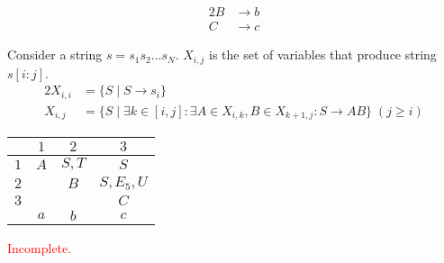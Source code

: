\documentclass[docid=PA09]{tcom_PA}
\begin{document}
{\begin{alignat*}{2}
	B   &\rightarrow b\\
	C   &\rightarrow c
\end{alignat*}
\begin{center}
\end{center}
Consider a string $s=s_1s_2\ldots s_N$. $X_{i,j}$ is the set of variables that produce string $s[i:j]$.
\begin{alignat*}{2}
	X_{i,i} &= \{S\mid S \rightarrow s_i\}\\
	X_{i,j} &= \{S\mid \exists k \in [i,j] \colon \exists A\in X_{i,k},B\in X_{k+1,j}\colon S \rightarrow AB\}\;(j \geq i)
\end{alignat*}
\begin{center} \begin{tabular}{c || c | c | c}
	\backslashbox{$i$}{$j$} & $1             $ & $2             $ & $3      $ \\ \hline
	$1                    $ & $A             $ & $S, T          $ & $S      $ \\
    $2                    $ & \cellcolor{gray} & $B             $ & $S,E_5,U$ \\
	$3                    $ & \cellcolor{gray} & \cellcolor{gray} & $C      $ \\ \hline
	$                     $ & $a             $ & $b$     & $c$
\end{tabular} \end{center}
\textcolor{red}{Incomplete.}
}
\end{document}
